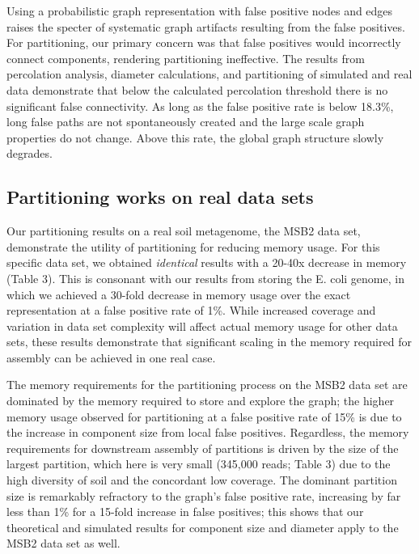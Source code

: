 \documentclass[draft]{pnastwo}
\begin{document}
\begin{article}
Using a probabilistic graph representation with false positive nodes
and edges raises the specter of systematic graph artifacts resulting
from the false positives.  For partitioning, our primary concern was
that false positives would incorrectly connect components, rendering
partitioning ineffective.  The results from percolation analysis,
diameter calculations, and partitioning of simulated and real data
demonstrate that below the calculated percolation threshold there is
no significant false connectivity.  As long as the false positive rate
is below 18.3\%, long false paths are not spontaneously created and
the large scale graph properties do not change.  Above this rate, the
global graph structure slowly degrades.

\subsection{Partitioning works on real data sets}

Our partitioning results on a real soil metagenome, the MSB2 data set,
demonstrate the utility of partitioning for reducing memory usage.
For this specific data set, we obtained {\em identical} results with a
20-40x decrease in memory (Table 3).
This is
consonant with our results from storing the E. coli genome, in which
we achieved a 30-fold decrease in memory usage over the exact
representation at a false positive rate of 1\%.  While increased
coverage and variation in data set complexity will affect actual
memory usage for other data sets, these results demonstrate that
significant scaling in the memory required for assembly can be
achieved in one real case.

The memory requirements for the partitioning process on the MSB2 data
set are dominated by the memory required to store and explore the
graph; the higher memory usage observed for partitioning at a false
positive rate of 15\% is due to the increase in component size from
local false positives.  Regardless, the memory requirements for
downstream assembly of partitions is driven by the size of the largest
partition, which here is very small (345,000 reads; Table 3)
due to the high diversity of soil and the
concordant low coverage.  The dominant partition size is remarkably
refractory to the graph's false positive rate, increasing by far less
than 1\% for a 15-fold increase in false positives; this shows that
our theoretical and simulated results for component size and diameter
apply to the MSB2 data set as well.


\end{article}
\end{document}
